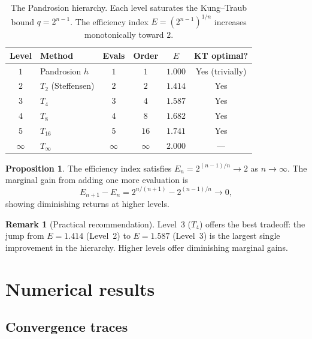 \documentclass[11pt,a4paper]{article}
\theoremstyle{definition}
\newtheorem{proposition}{Proposition}[section]
\newtheorem{remark}{Remark}[section]
\begin{document}
\begin{table}[H]
\centering
\renewcommand{\arraystretch}{1.2}
\begin{tabular}{clcccc}
\toprule
\textbf{Level} & \textbf{Method} & \textbf{Evals} & \textbf{Order} & \textbf{$E$} & \textbf{KT optimal?} \\
\midrule
$1$ & Pandrosion $h$ & $1$ & $1$ & $1.000$ & Yes (trivially) \\
$2$ & $T_2$ (Steffensen) & $2$ & $2$ & $1.414$ & Yes \\
$3$ & $T_4$ & $3$ & $4$ & $1.587$ & Yes \\
$4$ & $T_8$ & $4$ & $8$ & $1.682$ & Yes \\
$5$ & $T_{16}$ & $5$ & $16$ & $1.741$ & Yes \\
$\infty$ & $T_\infty$ & $\infty$ & $\infty$ & $2.000$ & --- \\
\bottomrule
\end{tabular}
\caption{The Pandrosion hierarchy.  Each level saturates the Kung--Traub bound $q = 2^{n-1}$.  The efficiency index $E = (2^{n-1})^{1/n}$ increases monotonically toward $2$.}
\label{tab:hierarchy}
\end{table}

\begin{proposition}
The efficiency index satisfies $E_n = 2^{(n-1)/n} \to 2$ as $n \to \infty$.  The marginal gain from adding one more evaluation is
\[
  E_{n+1} - E_n = 2^{n/(n+1)} - 2^{(n-1)/n} \to 0,
\]
showing diminishing returns at higher levels.
\end{proposition}

\begin{remark}[Practical recommendation]
Level~$3$ ($T_4$) offers the best tradeoff: the jump from $E = 1.414$ (Level~2) to $E = 1.587$ (Level~3) is the largest single improvement in the hierarchy.  Higher levels offer diminishing marginal gains.
\end{remark}

\section{Numerical results}
\label{sec:numerical}

\subsection{Convergence traces}
\end{document}
